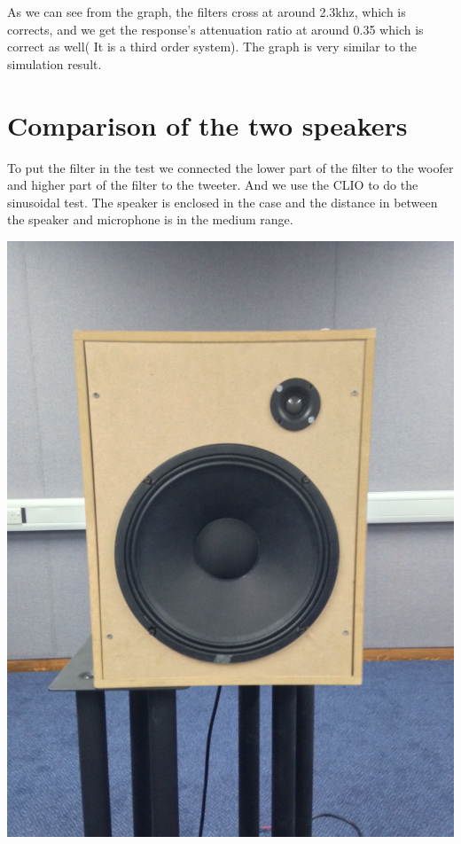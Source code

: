 \documentclass[11pt]{scrartcl}
\begin{document}
As we can see from the graph, the filters cross at around 2.3khz, which is corrects, and we get the response's attenuation ratio at around 0.35 which is correct as well( It is a third order system). The graph is very similar to the simulation result.
\section{Comparison of the two speakers}

To put the filter in the test we connected the lower part of the filter to the woofer and higher part of the filter to the tweeter. And we use the CLIO to do the sinusoidal test. The speaker is enclosed in the case and the distance in between the speaker and microphone is in the medium range. 

\begin{center}
 \begin{minipage}[t]{\linewidth}
 
 {
 \includegraphics[scale = 0.1]{1385.JPG}
 }
 \end{minipage}
 \medskip
 \end{center}
\end{document}

